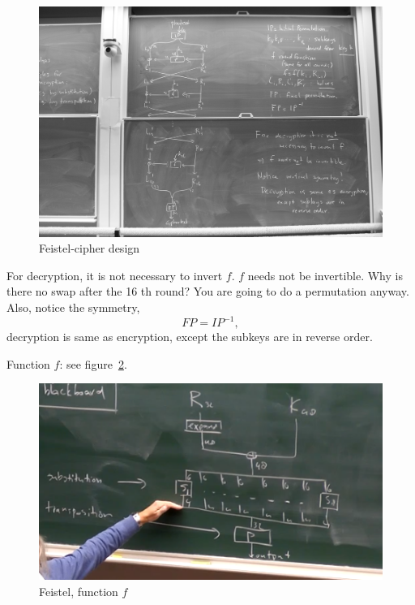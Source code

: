 \documentclass[language=english,number=]{homework}
\begin{document}
\begin{figure}
    \centering
    \includegraphics[width=\textwidth]{feistel.PNG}
    \caption{Feistel-cipher design}
    \label{feistel}
\end{figure}

    For decryption, it is not necessary to invert $f$.
    $f$ needs not be invertible.
    Why is there no swap after the 16 th round?
    You are going to do a permutation anyway.
    Also, notice the symmetry,
    \[
        FP = IP^{-1},
    \]
    decryption is same as encryption, except the subkeys are in reverse order.

    Function $f$: see figure~\ref{feistelf}.
\begin{figure}
    \centering
    \includegraphics[width=\textwidth]{feistelf.PNG}
    \caption{Feistel, function $f$}
    \label{feistelf}
\end{figure}
\end{document}
